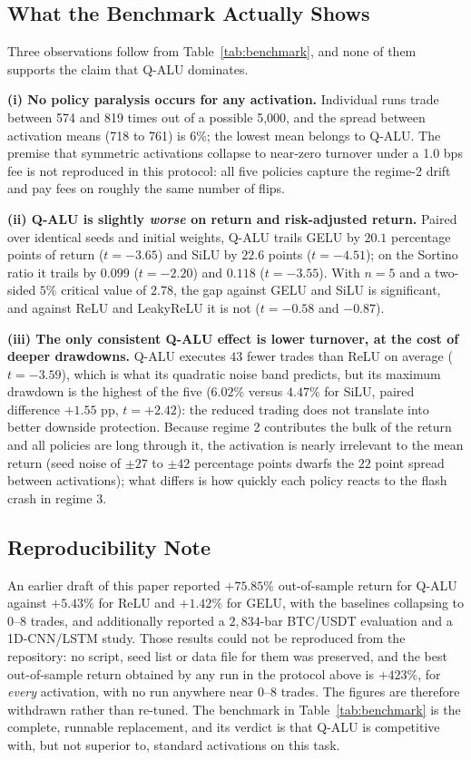 \documentclass[conference]{IEEEtran}
\begin{document}
\subsection{What the Benchmark Actually Shows}
Three observations follow from Table~\ref{tab:benchmark}, and none of them supports the claim that Q-ALU dominates.

\textbf{(i) No policy paralysis occurs for any activation.} Individual runs trade between 574 and 819 times out of a possible 5,000, and the spread between activation means (718 to 761) is 6\%; the lowest mean belongs to Q-ALU. The premise that symmetric activations collapse to near-zero turnover under a 1.0 bps fee is not reproduced in this protocol: all five policies capture the regime-2 drift and pay fees on roughly the same number of flips.

\textbf{(ii) Q-ALU is slightly \emph{worse} on return and risk-adjusted return.} Paired over identical seeds and initial weights, Q-ALU trails GELU by $20.1$ percentage points of return ($t = -3.65$) and SiLU by $22.6$ points ($t = -4.51$); on the Sortino ratio it trails by $0.099$ ($t = -2.20$) and $0.118$ ($t = -3.55$). With $n = 5$ and a two-sided $5\%$ critical value of $2.78$, the gap against GELU and SiLU is significant, and against ReLU and LeakyReLU it is not ($t = -0.58$ and $-0.87$).

\textbf{(iii) The only consistent Q-ALU effect is lower turnover, at the cost of deeper drawdowns.} Q-ALU executes $43$ fewer trades than ReLU on average ($t = -3.59$), which is what its quadratic noise band predicts, but its maximum drawdown is the highest of the five ($6.02\%$ versus $4.47\%$ for SiLU, paired difference $+1.55$ pp, $t = +2.42$): the reduced trading does not translate into better downside protection. Because regime 2 contributes the bulk of the return and all policies are long through it, the activation is nearly irrelevant to the mean return (seed noise of $\pm 27$ to $\pm 42$ percentage points dwarfs the $22$ point spread between activations); what differs is how quickly each policy reacts to the flash crash in regime 3.

\subsection{Reproducibility Note}
An earlier draft of this paper reported $+75.85\%$ out-of-sample return for Q-ALU against $+5.43\%$ for ReLU and $+1.42\%$ for GELU, with the baselines collapsing to $0$--$8$ trades, and additionally reported a $2{,}834$-bar BTC/USDT evaluation and a 1D-CNN/LSTM study. Those results could not be reproduced from the repository: no script, seed list or data file for them was preserved, and the best out-of-sample return obtained by any run in the protocol above is $+423\%$, for \emph{every} activation, with no run anywhere near $0$--$8$ trades. The figures are therefore withdrawn rather than re-tuned. The benchmark in Table~\ref{tab:benchmark} is the complete, runnable replacement, and its verdict is that Q-ALU is competitive with, but not superior to, standard activations on this task.
\end{document}
